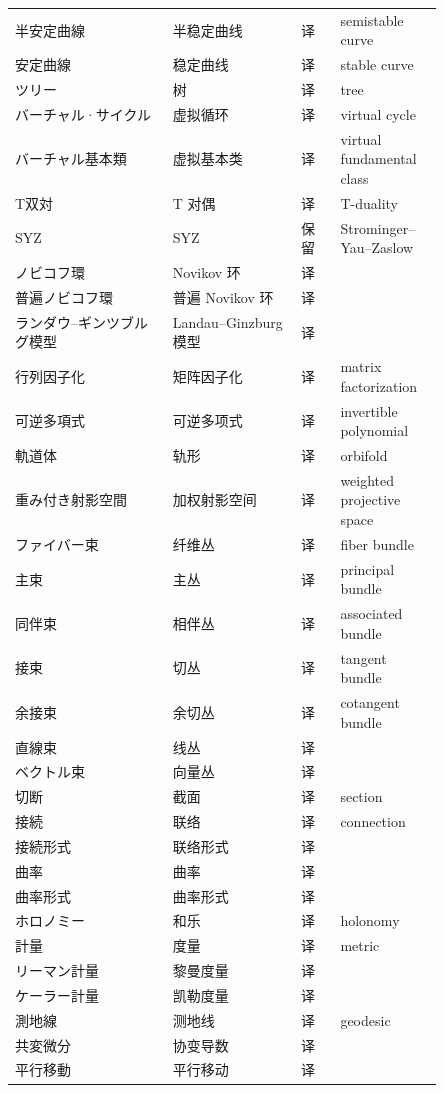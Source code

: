 {\begin{longtable}{p{0.32\linewidth} p{0.26\linewidth} p{0.08\linewidth} p{0.19\linewidth}}
半安定曲線 & 半稳定曲线 & 译 & semistable curve \\
安定曲線 & 稳定曲线 & 译 & stable curve \\
ツリー & 树 & 译 & tree \\
バーチャル·サイクル & 虚拟循环 & 译 & virtual cycle \\
バーチャル基本類 & 虚拟基本类 & 译 & virtual fundamental class \\
T双対 & T 对偶 & 译 & T-duality \\
SYZ & SYZ & 保留 & Strominger–Yau–Zaslow \\
ノビコフ環 & Novikov 环 & 译 &  \\
普遍ノビコフ環 & 普遍 Novikov 环 & 译 &  \\
ランダウ–ギンツブルグ模型 & Landau–Ginzburg 模型 & 译 &  \\
行列因子化 & 矩阵因子化 & 译 & matrix factorization \\
可逆多項式 & 可逆多项式 & 译 & invertible polynomial \\
軌道体 & 轨形 & 译 & orbifold \\
重み付き射影空間 & 加权射影空间 & 译 & weighted projective space \\
ファイバー束 & 纤维丛 & 译 & fiber bundle \\
主束 & 主丛 & 译 & principal bundle \\
同伴束 & 相伴丛 & 译 & associated bundle \\
接束 & 切丛 & 译 & tangent bundle \\
余接束 & 余切丛 & 译 & cotangent bundle \\
直線束 & 线丛 & 译 &  \\
ベクトル束 & 向量丛 & 译 &  \\
切断 & 截面 & 译 & section \\
接続 & 联络 & 译 & connection \\
接続形式 & 联络形式 & 译 &  \\
曲率 & 曲率 & 译 &  \\
曲率形式 & 曲率形式 & 译 &  \\
ホロノミー & 和乐 & 译 & holonomy \\
計量 & 度量 & 译 & metric \\
リーマン計量 & 黎曼度量 & 译 &  \\
ケーラー計量 & 凯勒度量 & 译 &  \\
測地線 & 测地线 & 译 & geodesic \\
共変微分 & 协变导数 & 译 &  \\
平行移動 & 平行移动 & 译 &  \\

\end{longtable}}
